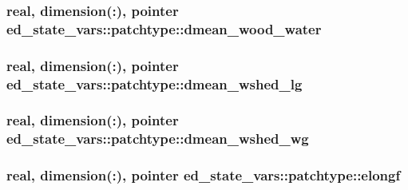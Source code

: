 \subsubsection[{\texorpdfstring{dmean\+\_\+wood\+\_\+water}{dmean_wood_water}}]{\setlength{\rightskip}{0pt plus 5cm}real, dimension(\+:), pointer ed\+\_\+state\+\_\+vars\+::patchtype\+::dmean\+\_\+wood\+\_\+water}\hypertarget{structed__state__vars_1_1patchtype_a89f0bee3c32b8c9f69ee1e35ca19e4aa}{}\label{structed__state__vars_1_1patchtype_a89f0bee3c32b8c9f69ee1e35ca19e4aa}
\subsubsection[{\texorpdfstring{dmean\+\_\+wshed\+\_\+lg}{dmean_wshed_lg}}]{\setlength{\rightskip}{0pt plus 5cm}real, dimension(\+:), pointer ed\+\_\+state\+\_\+vars\+::patchtype\+::dmean\+\_\+wshed\+\_\+lg}\hypertarget{structed__state__vars_1_1patchtype_aaa9517a9235393d22e56b6943c64b3aa}{}\label{structed__state__vars_1_1patchtype_aaa9517a9235393d22e56b6943c64b3aa}
\subsubsection[{\texorpdfstring{dmean\+\_\+wshed\+\_\+wg}{dmean_wshed_wg}}]{\setlength{\rightskip}{0pt plus 5cm}real, dimension(\+:), pointer ed\+\_\+state\+\_\+vars\+::patchtype\+::dmean\+\_\+wshed\+\_\+wg}\hypertarget{structed__state__vars_1_1patchtype_a226555cbab379b79baa784949f0bd5b0}{}\label{structed__state__vars_1_1patchtype_a226555cbab379b79baa784949f0bd5b0}
\subsubsection[{\texorpdfstring{elongf}{elongf}}]{\setlength{\rightskip}{0pt plus 5cm}real, dimension(\+:), pointer ed\+\_\+state\+\_\+vars\+::patchtype\+::elongf}\hypertarget{structed__state__vars_1_1patchtype_aa0984e5ac2952101089327d0c40a4b55}{}\label{structed__state__vars_1_1patchtype_aa0984e5ac2952101089327d0c40a4b55}
